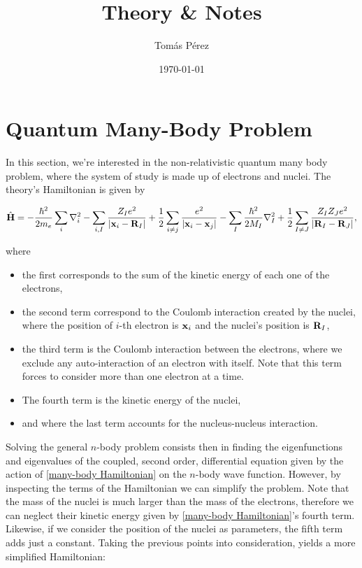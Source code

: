 \documentclass{homework}
\author{Tomás Pérez}
\date{\today}
\title{Theory \& Notes}
\begin{document}
 \maketitle

\section{Quantum Many-Body Problem}

In this section, we're interested in the non-relativistic quantum many body problem, where the system of study is made up of electrons and nuclei. The theory's Hamiltonian is given by

\begin{align}
    \hat{\bf H} = -\frac{\hbar^2}{2m_e} \sum_i \nabla^2_i - \sum_{i, I} \frac{Z_I e^2}{|{\bf x}_i - {\bf R}_I|} + \frac{1}{2} \sum_{i \neq j} \frac{e^2}{|{\bf x}_i-{\bf x}_j|} - \sum_{I} \frac{\hbar^2}{2M_I} \nabla^2_I + \frac{1}{2} \sum_{I \neq J} \frac{Z_I Z_J e^2}{|{\bf R}_I - {\bf R}_J|},
\label{many-body Hamiltonian}
\end{align}

where 

\begin{itemize}
    \item the first corresponds to the sum of the kinetic energy of each one of the electrons,
    \item the second term correspond to the Coulomb interaction created by the nuclei, where the position of $i$-th electron is ${\bf x}_i$ and the nuclei's position is ${\bf R}_I$,
    \item the third term is the Coulomb interaction between the electrons, where we exclude any auto-interaction of an electron with itself. Note that this term forces to consider more than one electron at a time. 
    \item The fourth term is the kinetic energy of the nuclei,
    \item and where the last term accounts for the nucleus-nucleus interaction. \\
\end{itemize}

Solving the general $n$-body problem consists then in finding the eigenfunctions and eigenvalues of the coupled, second order, differential equation given by the action of \eqref{many-body Hamiltonian} on the $n$-body wave function. However, by inspecting the terms of the Hamiltonian we can simplify the problem. Note that the mass of the nuclei is much larger than the mass of the electrons, therefore we can neglect their kinetic energy given by \eqref{many-body Hamiltonian}'s fourth term. Likewise, if we consider the position of the nuclei as parameters, the fifth term adds just a constant. Taking the previous points into consideration, yields a more simplified Hamiltonian:
\end{document}
